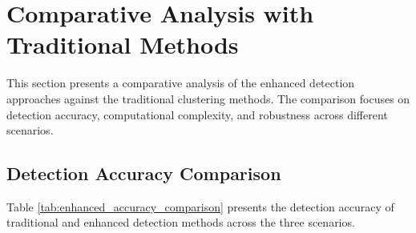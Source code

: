 \section{Comparative Analysis with Traditional Methods}

This section presents a comparative analysis of the enhanced detection approaches against the traditional clustering methods. The comparison focuses on detection accuracy, computational complexity, and robustness across different scenarios.

\subsection{Detection Accuracy Comparison}

Table \ref{tab:enhanced_accuracy_comparison} presents the detection accuracy of traditional and enhanced detection methods across the three scenarios.

